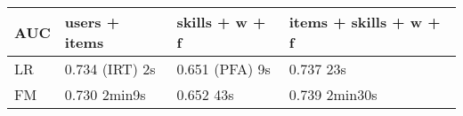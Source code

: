 \begin{tabular}[]{llll}
\toprule
AUC & users + items & skills + w + f & items + skills + w +
f\tabularnewline
\midrule
LR & 0.734 (IRT) 2s & 0.651 (PFA) 9s & 0.737 23s\tabularnewline
FM & 0.730 2min9s & 0.652 43s & 0.739 2min30s\tabularnewline
\bottomrule
\end{tabular}
